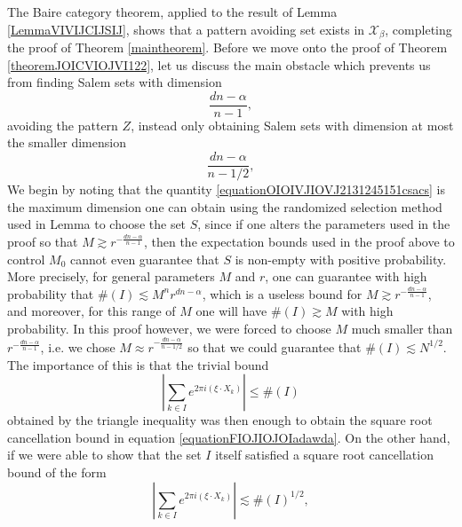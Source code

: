 \documentclass[dvipsnames,letterpaper,12pt]{article}
\numberwithin{equation}{section}
\numberwithin{theorem}{section}
\begin{document}
The Baire category theorem, applied to the result of Lemma \ref{LemmaVIVIJCIJSIJ}, shows that a pattern avoiding set exists in $\mathcal{X}_\beta$, completing the proof of Theorem \ref{maintheorem}. Before we move onto the proof of Theorem \ref{theoremJOICVIOJVI122}, let us discuss the main obstacle which prevents us from finding Salem sets with dimension
%
\begin{equation} \label{equationOIOIVJIOVJ2131245151csacs}
    \frac{dn - \alpha}{n - 1},
\end{equation}
%
avoiding the pattern $Z$, instead only obtaining Salem sets with dimension at most the smaller dimension
%
\begin{equation} \label{equationCIONCIOJIOAJ12312}
    \frac{dn - \alpha}{n-1/2},
\end{equation}
%
We begin by noting that the quantity \eqref{equationOIOIVJIOVJ2131245151csacs} is the maximum dimension one can obtain using the randomized selection method used in Lemma \label{LemmaVIVIJCIJSIJ} to choose the set $S$, since if one alters the parameters used in the proof so that $M \gtrsim r^{-\frac{dn-\alpha}{n-1}}$, then the expectation bounds used in the proof above to control $M_0$ cannot even guarantee that $S$ is non-empty with positive probability. More precisely, for general parameters $M$ and $r$, one can guarantee with high probability that $\#(I) \lesssim M^n r^{dn - \alpha}$, which is a useless bound for $M \gtrsim r^{-\frac{dn-\alpha}{n-1}}$, and moreover, for this range of $M$ one will have $\#(I) \gtrsim M$ with high probability. In this proof however, we were forced to choose $M$ much smaller than $r^{-\frac{dn-\alpha}{n-1}}$, i.e. we chose $M \approx r^{-\frac{dn - \alpha}{n - 1/2}}$ so that we could guarantee that $\#(I) \lesssim N^{1/2}$. The importance of this is that the trivial bound
%
\begin{equation}
    \left| \sum_{k \in I} e^{2 \pi i (\xi \cdot X_k)} \right| \leq \#(I)
\end{equation}
%
obtained by the triangle inequality was then enough to obtain the square root cancellation bound in equation \eqref{equationFIOJIOJOIadawda}. On the other hand, if we were able to show that the set $I$ itself satisfied a square root cancellation bound of the form
%
\begin{equation} \label{equationDOIJCVOIVJOI213123}
    \left| \sum_{k \in I} e^{2 \pi i (\xi \cdot X_k)} \right| \lesssim \#(I)^{1/2},
\end{equation}
%
\end{document}
